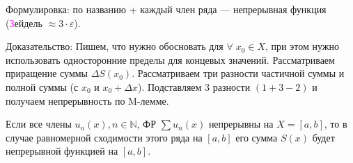 \begin{col-answer-preambule}
  \begin{plan}
  	\item Формулировка: по названию + каждый член ряда — непрерывная функция (\textcolor{magenta}{З}ейдель $ \approx 3 \cdot \varepsilon$).
  	\item Доказательство:
    \subitem Пишем, что нужно обосновать для $\forall \; x_0 \in X$, при этом нужно использовать односторонние пределы для концевых значений.
    \subitem Рассматриваем приращение суммы $\Delta S(x_0)$.
    \subitem Рассматриваем три разности частичной суммы и полной суммы (с $x_0$ и $x_0 + \Delta x$).
    \subitem Подставляем $3$ разности $(1 + 3 - 2)$ и получаем непрерывность по M-лемме.
  \end{plan}
\end{col-answer-preambule}
\begin{theorem}
	Если все члены $u_n(x), n \in \mathbb{N}$, ФР $\sum u_n(x)$ непрерывны на $X = [a,b]$, то в случае равномерной сходимости этого ряда на $[a,b]$ его сумма $S(x)$ будет непрерывной функцией на $[a,b]$.
\end{theorem}
